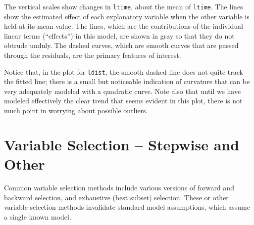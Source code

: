 \documentclass{tufte-book}\usepackage[]{graphicx}\usepackage[]{color}
\newcommand{\txtt}[1]{\texttt{#1}}
\begin{document}
The vertical scales show changes in \txtt{ltime}, about the mean of
\txtt{ltime}.  The lines show the estimated effect of each explanatory
variable when the other variable is held at its mean value.  The
lines, which are the contributions of the individual linear terms
(``effects'') in this model, are shown in gray so that they do not
obtrude unduly. The dashed curves, which are smooth curves that are
passed through the residuals, are the primary features of interest.

Notice that, in the plot for \txtt{ldist}, the smooth dashed line does
not quite track the fitted line; there is a small but noticeable
indication of curvature that can be very adequately modeled with a
quadratic curve.  Note also that until we have modeled effectively the
clear trend that seems evident in this plot, there is not much
point in worrying about possible outliers.

\section{Variable Selection -- Stepwise and Other}\label{ss:varsel}

Common variable selection methods include various versions of forward
and backward selection, and exhaustive (best subset) selection.  These
or other variable selection methods invalidate standard model
assumptions, which assume a single known model.
\end{document}
